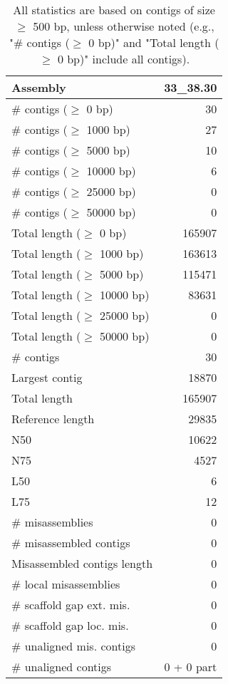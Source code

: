 \documentclass[12pt,a4paper]{article}
\begin{document}
\begin{table}[ht]
\begin{center}
\caption{All statistics are based on contigs of size $\geq$ 500 bp, unless otherwise noted (e.g., "\# contigs ($\geq$ 0 bp)" and "Total length ($\geq$ 0 bp)" include all contigs).}
\begin{tabular}{|l*{1}{|r}|}
\hline
Assembly & 33\_38.30 \\ \hline
\# contigs ($\geq$ 0 bp) & 30 \\ \hline
\# contigs ($\geq$ 1000 bp) & 27 \\ \hline
\# contigs ($\geq$ 5000 bp) & 10 \\ \hline
\# contigs ($\geq$ 10000 bp) & 6 \\ \hline
\# contigs ($\geq$ 25000 bp) & 0 \\ \hline
\# contigs ($\geq$ 50000 bp) & 0 \\ \hline
Total length ($\geq$ 0 bp) & 165907 \\ \hline
Total length ($\geq$ 1000 bp) & 163613 \\ \hline
Total length ($\geq$ 5000 bp) & 115471 \\ \hline
Total length ($\geq$ 10000 bp) & 83631 \\ \hline
Total length ($\geq$ 25000 bp) & 0 \\ \hline
Total length ($\geq$ 50000 bp) & 0 \\ \hline
\# contigs & 30 \\ \hline
Largest contig & 18870 \\ \hline
Total length & 165907 \\ \hline
Reference length & 29835 \\ \hline
N50 & 10622 \\ \hline
N75 & 4527 \\ \hline
L50 & 6 \\ \hline
L75 & 12 \\ \hline
\# misassemblies & 0 \\ \hline
\# misassembled contigs & 0 \\ \hline
Misassembled contigs length & 0 \\ \hline
\# local misassemblies & 0 \\ \hline
\# scaffold gap ext. mis. & 0 \\ \hline
\# scaffold gap loc. mis. & 0 \\ \hline
\# unaligned mis. contigs & 0 \\ \hline
\# unaligned contigs & 0 + 0 part \\ \hline

\end{tabular}
\end{center}
\end{table}
\end{document}
